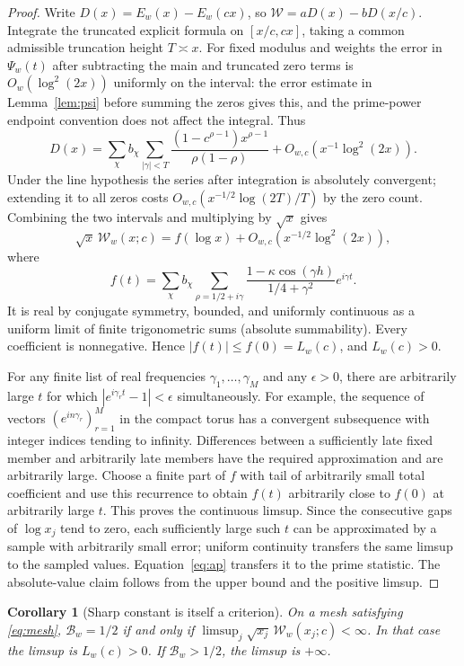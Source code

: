 \documentclass[11pt]{article}
\newtheorem{corollary}[theorem]{Corollary}
\theoremstyle{remark}\newtheorem{remark}[theorem]{Remark}
\newcommand{\B}{\mathcal B}\newcommand{\W}{\mathcal W}
\begin{document}
\begin{proof}
Write $D(x)=E_w(x)-E_w(cx)$, so $\W=aD(x)-bD(x/c)$. Integrate the truncated explicit formula on $[x/c,cx]$, taking a common admissible truncation height $T\asymp x$. For fixed modulus and weights the error in $\Psi_w(t)$ after subtracting the main and truncated zero terms is $O_w(\log^2(2x))$ uniformly on the interval: the error estimate in Lemma~\ref{lem:psi} before summing the zeros gives this, and the prime-power endpoint convention does not affect the integral. Thus
\[
 D(x)=\sum_\chi b_\chi\sum_{|\gamma|<T}
 \frac{(1-c^{\rho-1})x^{\rho-1}}{\rho(1-\rho)}
 +O_{w,c}(x^{-1}\log^2(2x)).
\]
Under the line hypothesis the series after integration is absolutely convergent; extending it to all zeros costs $O_{w,c}(x^{-1/2}\log(2T)/T)$ by the zero count. Combining the two intervals and multiplying by $\sqrt x$ gives
\begin{equation}\label{eq:ap}
 \sqrt x\,\W_w(x;c)=f(\log x)+O_{w,c}(x^{-1/2}\log^2(2x)),
\end{equation}
where
\[
 f(t)=\sum_\chi b_\chi\sum_{\rho=1/2+i\gamma}
 \frac{1-\kappa\cos(\gamma h)}{1/4+\gamma^2}e^{i\gamma t}.
\]
It is real by conjugate symmetry, bounded, and uniformly continuous as a uniform limit of finite trigonometric sums (absolute summability). Every coefficient is nonnegative. Hence $|f(t)|\le f(0)=L_w(c)$, and $L_w(c)>0$.

For any finite list of real frequencies $\gamma_1,\ldots,\gamma_M$ and any $\epsilon>0$, there are arbitrarily large $t$ for which $|e^{i\gamma_r t}-1|<\epsilon$ simultaneously. For example, the sequence of vectors $(e^{in\gamma_r})_{r=1}^M$ in the compact torus has a convergent subsequence with integer indices tending to infinity. Differences between a sufficiently late fixed member and arbitrarily late members have the required approximation and are arbitrarily large. Choose a finite part of $f$ with tail of arbitrarily small total coefficient and use this recurrence to obtain $f(t)$ arbitrarily close to $f(0)$ at arbitrarily large $t$. This proves the continuous limsup. Since the consecutive gaps of $\log x_j$ tend to zero, each sufficiently large such $t$ can be approximated by a sample with arbitrarily small error; uniform continuity transfers the same limsup to the sampled values. Equation~\eqref{eq:ap} transfers it to the prime statistic. The absolute-value claim follows from the upper bound and the positive limsup.
\end{proof}
\begin{corollary}[Sharp constant is itself a criterion]
On a mesh satisfying \eqref{eq:mesh}, $\B_w=1/2$ if and only if $\limsup_j\sqrt{x_j}\,\W_w(x_j;c)<\infty$. In that case the limsup is $L_w(c)>0$. If $\B_w>1/2$, the limsup is $+\infty$.
\end{corollary}
\end{document}
